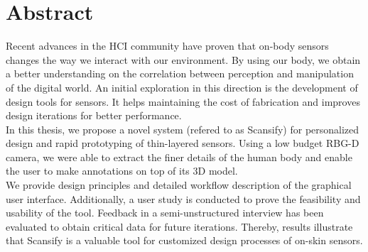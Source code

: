%
%
\sectionfix
\section*{Abstract}
Recent advances in the HCI community have proven that on-body sensors changes the way we interact with our environment. By using our body, we obtain a better understanding on the correlation between perception and manipulation of the digital world. An initial exploration in this direction is the development of design tools for sensors. It helps maintaining the cost of fabrication and improves design iterations for better performance.\\
In this thesis, we propose a novel system (refered to as Scansify) for personalized design and rapid prototyping of thin-layered sensors. Using a low budget RBG-D camera, we were able to extract the finer details of the human body and enable the user to make annotations on top of its 3D model.\\
We provide design principles and detailed workflow description of the graphical user interface. Additionally, a user study is conducted to prove the feasibility and usability of the tool. Feedback in a semi-unstructured interview has been evaluated to obtain critical data for future iterations. Thereby, results illustrate that Scansify is a valuable tool for customized design processes of on-skin sensors.
